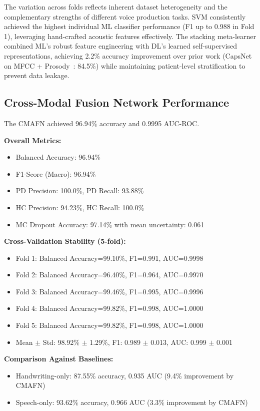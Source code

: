 \documentclass[10pt,conference,letterpaper]{IEEEtran}
\begin{document}
The variation across folds reflects inherent dataset heterogeneity and the complementary strengths of different voice production tasks. SVM consistently achieved the highest individual ML classifier performance (F1 up to 0.988 in Fold 1), leveraging hand-crafted acoustic features effectively. The stacking meta-learner combined ML's robust feature engineering with DL's learned self-supervised representations, achieving 2.2\% accuracy improvement over prior work (CapsNet on MFCC + Prosody~\cite{ref16}: 84.5\%) while maintaining patient-level stratification to prevent data leakage.

\subsection{Cross-Modal Fusion Network Performance}

The CMAFN achieved 96.94\% accuracy and 0.9995 AUC-ROC.

\textbf{Overall Metrics:}
\begin{itemize}
    \item Balanced Accuracy: 96.94\%
    \item F1-Score (Macro): 96.94\%
    \item PD Precision: 100.0\%, PD Recall: 93.88\%
    \item HC Precision: 94.23\%, HC Recall: 100.0\%
    \item MC Dropout Accuracy: 97.14\% with mean uncertainty: 0.061
\end{itemize}

\textbf{Cross-Validation Stability (5-fold):}
\begin{itemize}
    \item Fold 1: Balanced Accuracy=99.10\%, F1=0.991, AUC=0.9998
    \item Fold 2: Balanced Accuracy=96.40\%, F1=0.964, AUC=0.9970
    \item Fold 3: Balanced Accuracy=99.46\%, F1=0.995, AUC=0.9996
    \item Fold 4: Balanced Accuracy=99.82\%, F1=0.998, AUC=1.0000
    \item Fold 5: Balanced Accuracy=99.82\%, F1=0.998, AUC=1.0000
    \item Mean $\pm$ Std: 98.92\% $\pm$ 1.29\%, F1: 0.989 $\pm$ 0.013, AUC: 0.999 $\pm$ 0.001
\end{itemize}

\textbf{Comparison Against Baselines:}
\begin{itemize}
    \item Handwriting-only: 87.55\% accuracy, 0.935 AUC (9.4\% improvement by CMAFN)
    \item Speech-only: 93.62\% accuracy, 0.966 AUC (3.3\% improvement by CMAFN)
\end{itemize}
\end{document}
